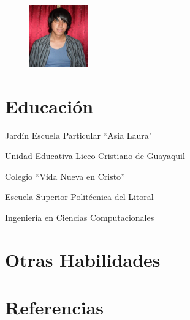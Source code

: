 \documentclass{res}
\begin{document}
\address{Sauces 8 Mz 454 Villa 2\\
\ \ \ \ Guayaquil-Ecuador\\
\ \ \ \ \ \ \ \ \ \ 084287897}
\begin{figure}
\includegraphics[totalheight=1.2in,width=1in]{CVPicture} %
\end{figure}

\begin{resume}
\vspace{0.4in}
\section{\large Educaci\'on}
\vspace{0.2in}

       Jard\'in Escuela Particular ``Asia Laura"  

       Unidad Educativa Liceo Cristiano de Guayaquil
       \vspace{-0.15in} 

       \hspace{1in} Colegio ``Vida Nueva en Cristo''  

       Escuela Superior Polit\'ecnica del Litoral  
       \vspace{-0.15in} 

       \hfill{Ingenier\'ia en Ciencias Computacionales}
\vspace{-0.15in}
\section{\large Otras Habilidades}
\vspace{0.2in}
\section{\large Referencias}
\vspace{0.2in}

\end{resume}
\end{document}
